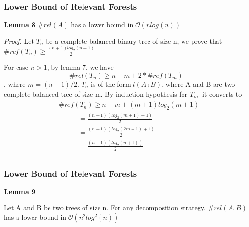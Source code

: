 \documentclass{beamer}
\begin{document}
\begin{frame}
\frametitle{Lower Bound of Relevant Forests}
\textbf{Lemma 8}
$\#rel(A)$ has a lower bound in $\mathcal{O}(nlog(n))$

\vspace{12pt} 
\emph{Proof.}
Let $T_n$ be a complete balanced binary tree of size n, we prove that $\#ref(T_n) \geq \frac{(n+1)log_2(n+1)}{2}$

For case $n > 1$, by lemma 7, we have
\begin{displaymath}
\#rel(T_n) \geq n - m + 2 * \#ref(T_m)
\end{displaymath}
, where $m=(n-1)/2$. $T_n$ is of the form $l(A \comp B)$, where A and B are two complete balanced tree of size m.
By induction hypothesis for $T_m$, it converts to
\begin{eqnarray*}
\begin{split}
& \#ref(T_n) \geq n - m + (m + 1)log_2(m+1)\\
& \ \ \ \ \ \ \ \ \ \ \ \ \ =\frac{(n + 1)(log_2(m + 1) + 1)}{2}\\
& \ \ \ \ \ \ \ \ \ \ \ \ \ =\frac{(n + 1)(log_2(2m + 1) + 1)}{2}\\
& \ \ \ \ \ \ \ \ \ \ \ \ \ =\frac{(n+1)(log_2(n+1))}{2}\\
\end{split}
\end{eqnarray*}
\end{frame}

\begin{frame}
\frametitle{Lower Bound of Relevant Forests}
\textbf{Lemma 9}

Let A and B be two trees of size n. For any decomposition strategy, $\#rel(A, B)$ has a lower bound in $\mathcal{O}(n^2log^2(n))$
\end{frame}

\end{document}
